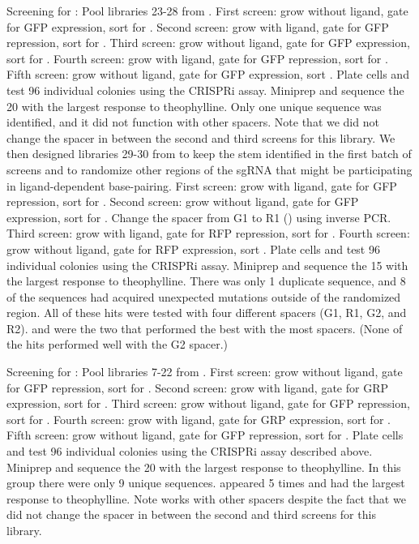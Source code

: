 \documentclass[10pt,oneside]{article}
\begin{document}
Screening for \ligrnaF{}: Pool libraries 23-28 from .  First screen: grow without ligand, gate for GFP expression, sort  for .  Second screen: grow with ligand, gate for GFP repression, sort  for .  Third screen: grow without ligand, gate for GFP expression, sort  for .  Fourth screen: grow with ligand, gate for GFP repression, sort  for .  Fifth screen: grow without ligand, gate for GFP expression, sort .  Plate cells and test 96 individual colonies using the CRISPRi assay.  Miniprep and sequence the 20 with the largest response to theophylline.  Only one unique sequence was identified, and it did not function with other spacers.  Note that we did not change the spacer in between the second and third screens for this library.  We then designed libraries 29-30 from  to keep the stem identified in the first batch of screens and to randomize other regions of the sgRNA that might be participating in ligand-dependent base-pairing.  First screen: grow with ligand, gate for GFP repression, sort  for .  Second screen: grow without ligand, gate for GFP expression, sort  for .  Change the spacer from G1 to R1 () using inverse PCR.  Third screen: grow with ligand, gate for RFP repression, sort  for .  Fourth screen: grow without ligand, gate for RFP expression, sort .  Plate cells and test 96 individual colonies using the CRISPRi assay.  Miniprep and sequence the 15 with the largest response to theophylline.  There was only 1 duplicate sequence, and 8 of the sequences had acquired unexpected mutations outside of the randomized region.  All of these hits were tested with four different spacers (G1, R1, G2, and R2).  \ligrnaF{} and  were the two that performed the best with the most spacers.  (None of the hits performed well with the G2 spacer.)

Screening for \ligrnaB{}: Pool libraries 7-22 from .  First screen: grow without ligand, gate for GFP repression, sort  for .  Second screen: grow with ligand, gate for GRP expression, sort  for .  Third screen: grow without ligand, gate for GFP repression, sort  for .  Fourth screen: grow with ligand, gate for GRP expression, sort  for .  Fifth screen: grow without ligand, gate for GFP repression, sort  for .  Plate cells and test 96 individual colonies using the CRISPRi assay described above.  Miniprep and sequence the 20 with the largest response to theophylline.  In this group there were only 9 unique sequences.  \ligrnaB{} appeared 5 times and had the largest response to theophylline.  Note \ligrnaB{} works with other spacers despite the fact that we did not change the spacer in between the second and third screens for this library.
\end{document}
